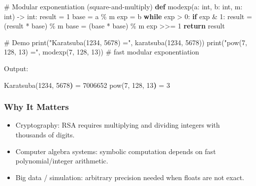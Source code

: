 \documentclass[
  letterpaper,
  DIV=11,
  numbers=noendperiod]{scrreprt}
\newenvironment{Shaded}{\begin{snugshade}}{\end{snugshade}}
\newcommand{\BuiltInTok}[1]{\textcolor[rgb]{0.00,0.23,0.31}{#1}}
\newcommand{\CommentTok}[1]{\textcolor[rgb]{0.37,0.37,0.37}{#1}}
\newcommand{\ControlFlowTok}[1]{\textcolor[rgb]{0.00,0.23,0.31}{\textbf{#1}}}
\newcommand{\DecValTok}[1]{\textcolor[rgb]{0.68,0.00,0.00}{#1}}
\newcommand{\ErrorTok}[1]{\textcolor[rgb]{0.68,0.00,0.00}{#1}}
\newcommand{\ExtensionTok}[1]{\textcolor[rgb]{0.00,0.23,0.31}{#1}}
\newcommand{\KeywordTok}[1]{\textcolor[rgb]{0.00,0.23,0.31}{\textbf{#1}}}
\newcommand{\NormalTok}[1]{\textcolor[rgb]{0.00,0.23,0.31}{#1}}
\newcommand{\OperatorTok}[1]{\textcolor[rgb]{0.37,0.37,0.37}{#1}}
\newcommand{\StringTok}[1]{\textcolor[rgb]{0.13,0.47,0.30}{#1}}
\providecommand{\tightlist}{%
  \setlength{\itemsep}{0pt}\setlength{\parskip}{0pt}}
\begin{document}
\begin{Shaded}
\begin{Highlighting}[]
\CommentTok{\# Modular exponentiation (square{-}and{-}multiply)}
\KeywordTok{def}\NormalTok{ modexp(a: }\BuiltInTok{int}\NormalTok{, b: }\BuiltInTok{int}\NormalTok{, m: }\BuiltInTok{int}\NormalTok{) }\OperatorTok{{-}\textgreater{}} \BuiltInTok{int}\NormalTok{:}
\NormalTok{    result }\OperatorTok{=} \DecValTok{1}
\NormalTok{    base }\OperatorTok{=}\NormalTok{ a }\OperatorTok{\%}\NormalTok{ m}
\NormalTok{    exp }\OperatorTok{=}\NormalTok{ b}
    \ControlFlowTok{while}\NormalTok{ exp }\OperatorTok{\textgreater{}} \DecValTok{0}\NormalTok{:}
        \ControlFlowTok{if}\NormalTok{ exp }\OperatorTok{\&} \DecValTok{1}\NormalTok{:}
\NormalTok{            result }\OperatorTok{=}\NormalTok{ (result }\OperatorTok{*}\NormalTok{ base) }\OperatorTok{\%}\NormalTok{ m}
\NormalTok{        base }\OperatorTok{=}\NormalTok{ (base }\OperatorTok{*}\NormalTok{ base) }\OperatorTok{\%}\NormalTok{ m}
\NormalTok{        exp }\OperatorTok{\textgreater{}\textgreater{}=} \DecValTok{1}
    \ControlFlowTok{return}\NormalTok{ result}

\CommentTok{\# Demo}
\BuiltInTok{print}\NormalTok{(}\StringTok{"Karatsuba(1234, 5678) ="}\NormalTok{, karatsuba(}\DecValTok{1234}\NormalTok{, }\DecValTok{5678}\NormalTok{))}
\BuiltInTok{print}\NormalTok{(}\StringTok{"pow(7, 128, 13) ="}\NormalTok{, modexp(}\DecValTok{7}\NormalTok{, }\DecValTok{128}\NormalTok{, }\DecValTok{13}\NormalTok{))  }\CommentTok{\# fast modular exponentiation}
\end{Highlighting}
\end{Shaded}

Output:

\begin{Shaded}
\begin{Highlighting}[]
\ExtensionTok{Karatsuba}\ErrorTok{(}\ExtensionTok{1234,}\NormalTok{ 5678}\KeywordTok{)} \ExtensionTok{=}\NormalTok{ 7006652}
\ExtensionTok{pow}\ErrorTok{(}\ExtensionTok{7,}\NormalTok{ 128, 13}\KeywordTok{)} \ExtensionTok{=}\NormalTok{ 3}
\end{Highlighting}
\end{Shaded}

\subsubsection{Why It Matters}\label{why-it-matters-5}

\begin{itemize}
\tightlist
\item
  Cryptography: RSA requires multiplying and dividing integers with
  thousands of digits.
\item
  Computer algebra systems: symbolic computation depends on fast
  polynomial/integer arithmetic.
\item
  Big data / simulation: arbitrary precision needed when floats are not
  exact.
\end{itemize}
\end{document}
